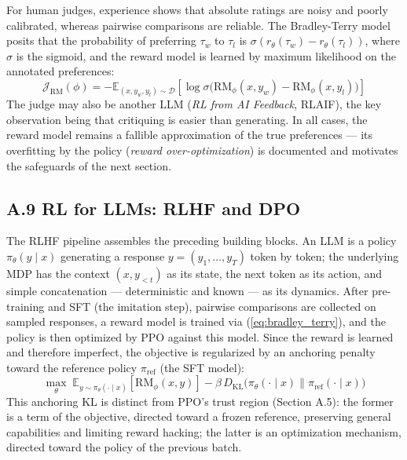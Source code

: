 \documentclass[11pt,a4paper]{article}
\begin{document}
For human judges, experience shows that absolute ratings are noisy and poorly calibrated, whereas pairwise comparisons are reliable. The Bradley-Terry model posits that the probability of preferring $\tau_w$ to $\tau_l$ is $\sigma(r_\theta(\tau_w) - r_\theta(\tau_l))$, where $\sigma$ is the sigmoid, and the reward model is learned by maximum likelihood on the annotated preferences:
\begin{equation}
\mathcal{J}_{\text{RM}}(\phi) = -\mathbb{E}_{(x, y_w, y_l) \sim \mathcal{D}} \left[ \log \sigma\big( \text{RM}_\phi(x, y_w) - \text{RM}_\phi(x, y_l) \big) \right]
\label{eq:bradley_terry}
\end{equation}
The judge may also be another LLM (\emph{RL from AI Feedback}, RLAIF), the key observation being that critiquing is easier than generating. In all cases, the reward model remains a fallible approximation of the true preferences — its overfitting by the policy (\emph{reward over-optimization}) is documented and motivates the safeguards of the next section.

\subsection*{A.9 RL for LLMs: RLHF and DPO}
The RLHF pipeline \cite{ouyang2022training} assembles the preceding building blocks. An LLM is a policy $\pi_\theta(y \mid x)$ generating a response $y = (y_1, \dots, y_T)$ token by token; the underlying MDP has the context $(x, y_{<t})$ as its state, the next token as its action, and simple concatenation — deterministic and known — as its dynamics. After pre-training and SFT (the imitation step), pairwise comparisons are collected on sampled responses, a reward model is trained via (\ref{eq:bradley_terry}), and the policy is then optimized by PPO against this model. Since the reward is learned and therefore imperfect, the objective is regularized by an anchoring penalty toward the reference policy $\pi_{\text{ref}}$ (the SFT model):
\begin{equation}
\max_\theta \; \mathbb{E}_{y \sim \pi_\theta(\cdot \mid x)} \left[ \text{RM}_\phi(x, y) \right] - \beta \, D_{\text{KL}}\big( \pi_\theta(\cdot \mid x) \parallel \pi_{\text{ref}}(\cdot \mid x) \big)
\label{eq:rlhf_objective}
\end{equation}
This anchoring KL is distinct from PPO's trust region (Section A.5): the former is a term of the objective, directed toward a frozen reference, preserving general capabilities and limiting reward hacking; the latter is an optimization mechanism, directed toward the policy of the previous batch.
\end{document}
